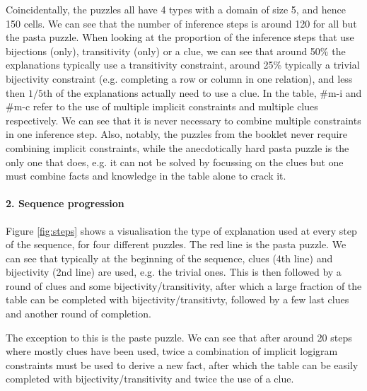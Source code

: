 Coincidentally, the puzzles all have 4 types with a domain of size 5, and hence 150 cells. We can see that the number of inference steps is around 120 for all but the pasta puzzle. When looking at the proportion of the inference steps that use bijections (only), transitivity (only) or a clue, we can see that around 50\% the explanations typically use a transitivity constraint, around 25\% typically a trivial bijectivity constraint (e.g. completing a row or column in one relation), and less then $1/5$th of the explanations actually need to use a clue.
In the table, \#m-i and \#m-c refer to the use of multiple implicit constraints and multiple clues respectively. We can see that it is never necessary to combine multiple constraints in one inference step. Also, notably, the puzzles from the booklet never require combining implicit constraints, while the anecdotically hard pasta puzzle is the only one that does, e.g. it can not be solved by focussing on the clues but one must combine facts and knowledge in the table alone to crack it.


\paragraph{2. Sequence progression}
Figure \ref{fig:steps} shows a visualisation the type of explanation used at every step of the sequence, for four different puzzles. The red line is the pasta puzzle. We can see that typically at the beginning of the sequence, clues (4th line) and bijectivity (2nd line) are used, e.g. the trivial ones. This is then followed by a round of clues and some bijectivity/transitivity, after which a large fraction of the table can be completed with bijectivity/transitivty, followed by a few last clues and another round of completion.

The exception to this is the paste puzzle. We can see that after around 20 steps where mostly clues have been used, twice a combination of implicit logigram constraints must be used to derive a new fact, after which the table can be easily completed with bijectivity/transitivity and twice the use of a clue.

